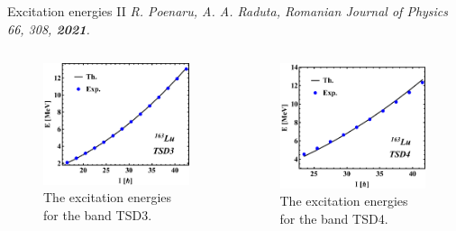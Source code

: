 \documentclass{beamer}
\begin{document}
\begin{frame}{Excitation energies II}
\small{\emph{R. Poenaru, A. A. Raduta, Romanian Journal of Physics 66, 308, \textbf{2021}.}}
    \begin{columns} 
\begin{figure}
    \centering
    \includegraphics[scale=0.4]{figs/DoubleShift_TSD3.pdf}
    \caption{The excitation energies for the band TSD3.}
\end{figure}
\begin{figure}
    \centering
    \includegraphics[scale=0.4]{figs/DoubleShift_TSD4.pdf}
    \caption{The excitation energies for the band TSD4.}
\end{figure}
\end{columns}
\end{frame}
\end{document}
